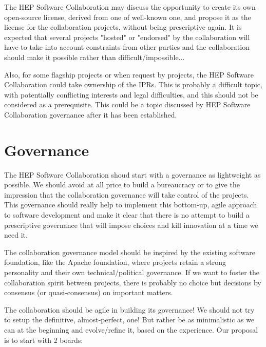 \documentclass[11pt]{article} %
\begin{document}
The HEP Software Collaboration may discuss the opportunity to create its own open-source license, derived from one of well-known one,
and propose it as the license for the collaboration projects, without being prescriptive again. It is expected that several projects
"hosted" or "endorsed" by the collaboration will have to take into account constraints from other parties and the collaboration should
make it possible rather than difficult/impossible... 

Also, for some flagship projects or when request by projects, the HEP Software Collaboration could take ownership of the IPRs. This
is probably a difficult topic, with potentially conflicting interests and legal difficulties, and this should not be considered as a 
prerequisite. This could be a topic discussed by HEP Software Collaboration governance after it has been established.


\section{Governance}

The HEP Software Collaboration shoud start with a governance as lightweight as possible. We should avoid at all price to build
a bureaucracy or to give the impression that the collaboration governance will take control of the projects. This governance should
really help to implement this bottom-up, agile approach to software development and make it clear that there is no attempt to
build a prescriptive governance that will impose choices and kill innovation at a time we need it.

The collaboration governance model should be inspired by the existing software foundation, like the Apache foundation, where projects
retain a strong personality and their own technical/political governance. If we want to foster the collaboration spirit between projects,
there is probably no choice but decisions by consensus (or quasi-consensus) on important matters.

The collaboration should be agile in building its governance! We should not try to setup the definitive, almost-perfect, one! But rather
be as minimalistic as we can at the beginning and evolve/refine it, based on the experience. Our proposal is to start with 2 boards:
\end{document}
